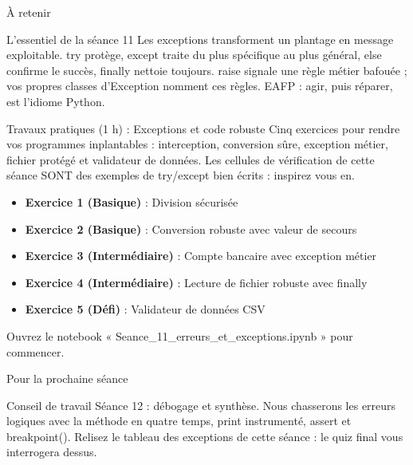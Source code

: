 \documentclass[aspectratio=169,11pt]{beamer}
\begin{document}
\begin{frame}{À retenir}
\begin{block}{L'essentiel de la séance 11}
Les exceptions transforment un plantage en message exploitable. try protège, except traite du plus spécifique au plus général, else confirme le succès, finally nettoie toujours. raise signale une règle métier bafouée ; vos propres classes d'Exception nomment ces règles. EAFP : agir, puis réparer, est l'idiome Python.
\end{block}
\end{frame}

\begin{frame}{Travaux pratiques (1 h) : Exceptions et code robuste}
Cinq exercices pour rendre vos programmes inplantables : interception, conversion sûre, exception métier, fichier protégé et validateur de données. Les cellules de vérification de cette séance SONT des exemples de try/except bien écrits : inspirez vous en.

\begin{itemize}
  \setlength{\itemsep}{1.5pt}\setlength{\parskip}{0pt}
  \item \textbf{Exercice 1 (Basique)} : Division sécurisée
  \item \textbf{Exercice 2 (Basique)} : Conversion robuste avec valeur de secours
  \item \textbf{Exercice 3 (Intermédiaire)} : Compte bancaire avec exception métier
  \item \textbf{Exercice 4 (Intermédiaire)} : Lecture de fichier robuste avec finally
  \item \textbf{Exercice 5 (Défi)} : Validateur de données CSV
\end{itemize}
\vspace{4pt}

{\small\color{PyGris}Ouvrez le notebook « Seance\_11\_erreurs\_et\_exceptions.ipynb » pour commencer.}
\end{frame}
\begin{frame}{Pour la prochaine séance}
\begin{exampleblock}{Conseil de travail}
Séance 12 : débogage et synthèse. Nous chasserons les erreurs logiques avec la méthode en quatre temps, print instrumenté, assert et breakpoint(). Relisez le tableau des exceptions de cette séance : le quiz final vous interrogera dessus.
\end{exampleblock}
\end{frame}
\end{document}

